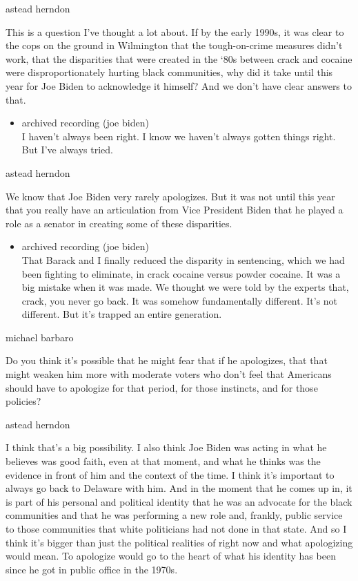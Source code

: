 astead herndon

This is a question I've thought a lot about. If by the early 1990s, it
was clear to the cops on the ground in Wilmington that the
tough-on-crime measures didn't work, that the disparities that were
created in the `80s between crack and cocaine were disproportionately
hurting black communities, why did it take until this year for Joe Biden
to acknowledge it himself? And we don't have clear answers to that.

\begin{itemize}
\tightlist
\item
  archived recording (joe biden)\\
  I haven't always been right. I know we haven't always gotten things
  right. But I've always tried.
\end{itemize}

astead herndon

We know that Joe Biden very rarely apologizes. But it was not until this
year that you really have an articulation from Vice President Biden that
he played a role as a senator in creating some of these disparities.

\begin{itemize}
\tightlist
\item
  archived recording (joe biden)\\
  That Barack and I finally reduced the disparity in sentencing, which
  we had been fighting to eliminate, in crack cocaine versus powder
  cocaine. It was a big mistake when it was made. We thought we were
  told by the experts that, crack, you never go back. It was somehow
  fundamentally different. It's not different. But it's trapped an
  entire generation.
\end{itemize}

michael barbaro

Do you think it's possible that he might fear that if he apologizes,
that that might weaken him more with moderate voters who don't feel that
Americans should have to apologize for that period, for those instincts,
and for those policies?

astead herndon

I think that's a big possibility. I also think Joe Biden was acting in
what he believes was good faith, even at that moment, and what he thinks
was the evidence in front of him and the context of the time. I think
it's important to always go back to Delaware with him. And in the moment
that he comes up in, it is part of his personal and political identity
that he was an advocate for the black communities and that he was
performing a new role and, frankly, public service to those communities
that white politicians had not done in that state. And so I think it's
bigger than just the political realities of right now and what
apologizing would mean. To apologize would go to the heart of what his
identity has been since he got in public office in the 1970s.

